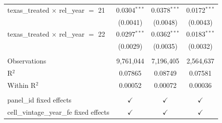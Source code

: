 \begin{tabular}{lccc}
   texas\_treated $\times$ rel\_year $=$ 21     & 0.0304$^{***}$        & 0.0378$^{***}$         & 0.0172$^{***}$\\   
                                                & (0.0041)              & (0.0048)               & (0.0043)\\   
   texas\_treated $\times$ rel\_year $=$ 22     & 0.0297$^{***}$        & 0.0362$^{***}$         & 0.0183$^{***}$\\   
                                                & (0.0029)              & (0.0035)               & (0.0032)\\   
    \\
   Observations                                 & 9,761,044             & 7,196,405              & 2,564,637\\  
   R$^2$                                        & 0.07865               & 0.08749                & 0.07581\\  
   Within R$^2$                                 & 0.00052               & 0.00072                & 0.00036\\  
    \\
   panel\_id fixed effects                      & $\checkmark$          & $\checkmark$           & $\checkmark$\\   
   cell\_vintage\_year\_fe fixed effects        & $\checkmark$          & $\checkmark$           & $\checkmark$\\   
   \bottomrule
\end{tabular}
\par\endgroup


